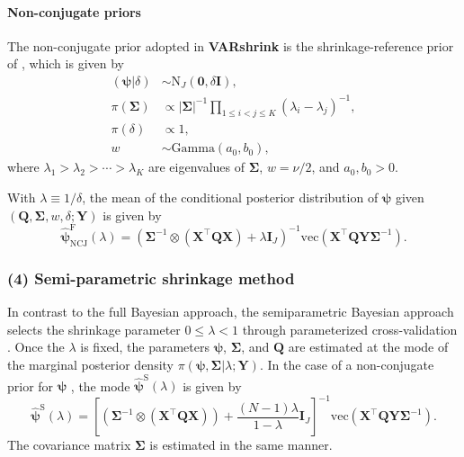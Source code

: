\paragraph{Non-conjugate priors}\label{non-conjugate-priors}

The non-conjugate prior adopted in \textbf{VARshrink} is the shrinkage-reference prior of \citet{Ni05}, which is given by
\begin{equation}
\begin{split}
  ( \boldsymbol\psi | \delta )
  & \sim \text{N}_{J} \left( \mathbf{0}, \delta \mathbf{I} \right),
  \\
  \pi( \mathbf{\Sigma} )
  & \propto |\mathbf{\Sigma}|^{-1} \prod_{1\leq i < j\leq K} (\lambda_i - \lambda_j)^{-1}, 
  \\
  \pi(\delta) & \propto 1, \\
  w & \sim \text{Gamma}(a_0, b_0),
\end{split}
\end{equation}
where
\(\lambda_1 > \lambda_2 > \cdots > \lambda_K\) are eigenvalues of \(\mathbf{\Sigma}\),
\(w = \nu / 2\), and \(a_0, b_0 > 0\).

With \(\lambda \equiv 1 / \delta\), the mean of the conditional posterior distribution of \(\boldsymbol\psi\) given \((\mathbf{Q}, \mathbf{\Sigma}, w, \delta; \mathbf{Y})\)
is given by
\begin{equation}
    \widehat{\boldsymbol\psi}^\text{F}_\text{NCJ}(\lambda)  = \left(\mathbf{\Sigma}^{-1} \otimes \left( \mathbf{X}^\top \mathbf{Q} \mathbf{X} \right) + \lambda \mathbf{I}_J     \right)^{-1} \text{vec}\left( \mathbf{X}^\top \mathbf{Q} \mathbf{Y} \mathbf{\Sigma}^{-1} \right).
    \label{eq:expr-fbayes-ncj-psihat}
\end{equation}

\subsubsection{(4) Semi-parametric shrinkage method}\label{semi-parametric-shrinkage-method}

In contrast to the full Bayesian approach, the semiparametric Bayesian approach selects the shrinkage parameter \(0 \leq \lambda < 1\) through parameterized cross-validation \citep{LeeChoiKim2016}.
Once the \(\lambda\) is fixed, the parameters \(\boldsymbol\psi\), \(\mathbf{\Sigma}\), and \(\mathbf{Q}\) are estimated at the mode of the marginal posterior density
\(\pi (\boldsymbol\psi, \mathbf{\Sigma} | \lambda; \mathbf{Y})\). In the
case of a non-conjugate prior for \(\boldsymbol\psi\) \citep{LeeChoiKim2016}, the mode
\(\widehat{\boldsymbol\psi}^\text{S} (\lambda)\)
is given by
\begin{equation}
    \widehat{\boldsymbol\psi}^{\text{S}} (\lambda)  =
    \left[\left(  \mathbf{\Sigma}^{-1} \otimes
          \left( \mathbf{X}^\top \mathbf{Q} \mathbf{X} \right) \right) + \frac{ (N - 1) \lambda}{1-\lambda} \mathbf{I}_J     \right]^{-1}
    \text{vec}\left( \mathbf{X}^\top \mathbf{Q} \mathbf{Y} \mathbf{\Sigma}^{-1} \right)
    .
    \label{eq:expr-sbayes-psihat}
\end{equation}
The covariance matrix \(\mathbf{\Sigma}\) is estimated in the same manner.


